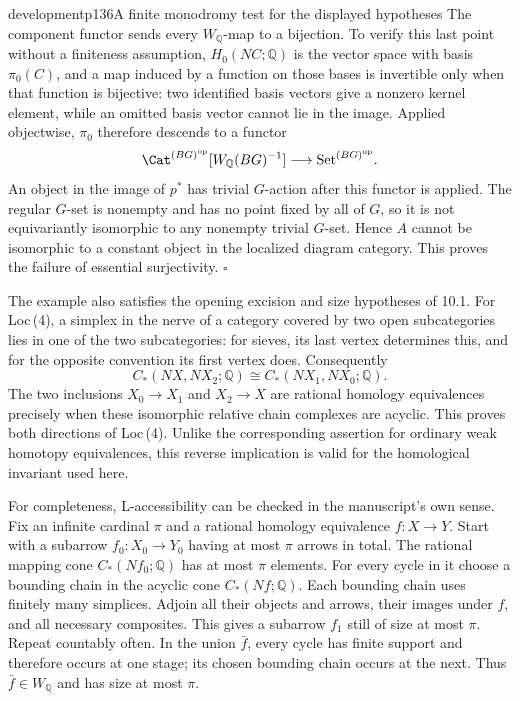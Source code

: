 \begin{dcomment}{development}{p136}{A finite monodromy test for the displayed hypotheses}
The component functor sends every $W_{\mathbb Q}$-map to a bijection. To verify this last point without a finiteness assumption, $H_0(NC;\mathbb Q)$ is the vector space with basis $\pi_0(C)$, and a map induced by a function on those bases is invertible only when that function is bijective: two identified basis vectors give a nonzero kernel element, while an omitted basis vector cannot lie in the image. Applied objectwise, $\pi_0$ therefore descends to a functor
\[
 \Cat^{(BG)^{\mathrm{op}}}[W_{\mathbb Q}(BG)^{-1}]
 \longrightarrow \mathrm{Set}^{(BG)^{\mathrm{op}}}.
\]
An object in the image of $p^*$ has trivial $G$-action after this functor is applied. The regular $G$-set is nonempty and has no point fixed by all of $G$, so it is not equivariantly isomorphic to any nonempty trivial $G$-set. Hence $A$ cannot be isomorphic to a constant object in the localized diagram category. This proves the failure of essential surjectivity. \hfill$\square$

The example also satisfies the opening excision and size hypotheses of 10.1. For Loc\,(4), a simplex in the nerve of a category covered by two open subcategories lies in one of the two subcategories: for sieves, its last vertex determines this, and for the opposite convention its first vertex does. Consequently
\[
 C_*(NX,NX_2;\mathbb Q)
 \cong C_*(NX_1,NX_0;\mathbb Q).
\]
The two inclusions $X_0\longrightarrow X_1$ and $X_2\longrightarrow X$ are rational homology equivalences precisely when these isomorphic relative chain complexes are acyclic. This proves both directions of Loc\,(4). Unlike the corresponding assertion for ordinary weak homotopy equivalences, this reverse implication is valid for the homological invariant used here.

For completeness, L-accessibility can be checked in the manuscript's own sense. Fix an infinite cardinal $\pi$ and a rational homology equivalence $f:X\longrightarrow Y$. Start with a subarrow $f_0:X_0\longrightarrow Y_0$ having at most $\pi$ arrows in total. The rational mapping cone $C_*(Nf_0;\mathbb Q)$ has at most $\pi$ elements. For every cycle in it choose a bounding chain in the acyclic cone $C_*(Nf;\mathbb Q)$. Each bounding chain uses finitely many simplices. Adjoin all their objects and arrows, their images under $f$, and all necessary composites. This gives a subarrow $f_1$ still of size at most $\pi$. Repeat countably often. In the union $\bar f$, every cycle has finite support and therefore occurs at one stage; its chosen bounding chain occurs at the next. Thus $\bar f\in W_{\mathbb Q}$ and has size at most $\pi$.


\end{dcomment}
